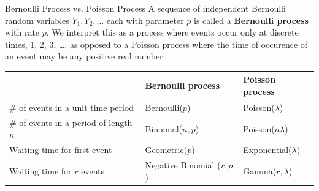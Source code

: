 \documentclass{beamer}
\renewcommand{\emph}{\textbf}
\begin{document}
%

\begin{frame}{Bernoulli Process vs. Poisson Process}
A sequence of independent Bernoulli random variables $Y_1,Y_2,\dots$ each with parameter $p$ is called a \emph{Bernoulli process} with rate $p$. We interpret this as a process where events occur only at discrete times, 1, 2, 3, \dots, as opposed to a Poisson process where the time of occurence of an event may be any positive real number.

\pause \begin{center}
\begin{tabular}{|p{2.83cm}|l|l|} \hline
& Bernoulli process & Poisson process \\ \hline
\# of events in a unit time period & Bernoulli($p$) & Poisson($\lambda$) \\ \hline
\# of events in a period of length $n$ & Binomial($n,p$) & Poisson($n\lambda$) \\ \hline \hline
Waiting time for first event & Geometric($p$) & Exponential($\lambda$) \\ \hline
Waiting time for $r$ events & Negative Binomial ($r,p$) & Gamma($r,\lambda$) \\ \hline
\end{tabular}
\end{center}
\end{frame}
\end{document}
